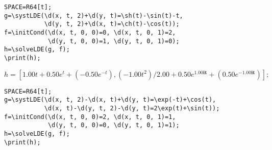 \begin{verbatim}
SPACE=R64[t];
g=\systLDE(\d(x, t, 2)+\d(y, t)=\sh(t)-\sin(t)-t, 
           \d(y, t, 2)+\d(x, t)=\ch(t)-\cos(t));
f=\initCond(\d(x, t, 0, 0)=0, \d(x, t, 0, 1)=2, 
            \d(y, t, 0, 0)=1, \d(y, t, 0, 1)=0);
h=\solveLDE(g, f); 
\print(h);
\end{verbatim}

{$h = [1. 00 t+0. 50 e^{t}+(-0. 50 e^{-t}), (-1. 00 t^{2})/2. 00+0. 50 e^{1. 00\mathbf{it}}+(0. 50 e^{-1. 00\mathbf{it}})];$}

\begin{verbatim}
SPACE=R64[t];
g=\systLDE(\d(x, t, 2)-\d(x, t)+\d(y, t)=\exp(-t)+\cos(t), 
           \d(x, t)-\d(y, t, 2)-\d(y, t)=2\exp(t)+\sin(t));
f=\initCond(\d(x, t, 0, 0)=2, \d(x, t, 0, 1)=1, 
            \d(y, t, 0, 0)=0, \d(y, t, 0, 1)=1);
h=\solveLDE(g, f); 
\print(h);
\end{verbatim}

